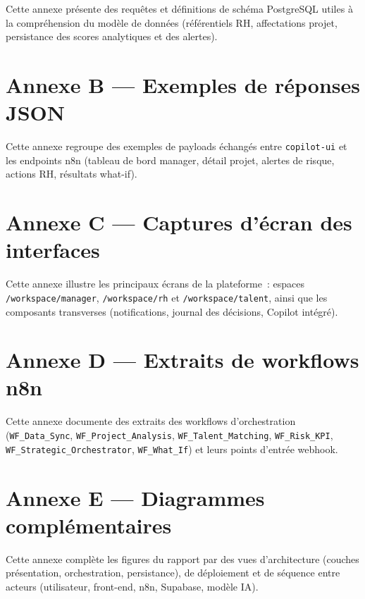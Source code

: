 Cette annexe présente des requêtes et définitions de schéma PostgreSQL utiles à la compréhension du modèle de données (référentiels RH, affectations projet, persistance des scores analytiques et des alertes).

\section*{Annexe B --- Exemples de réponses JSON}
\label{annexe:json}

Cette annexe regroupe des exemples de payloads échangés entre \texttt{copilot-ui} et les endpoints n8n (tableau de bord manager, détail projet, alertes de risque, actions RH, résultats what-if).

\section*{Annexe C --- Captures d'écran des interfaces}
\label{annexe:captures}

Cette annexe illustre les principaux écrans de la plateforme~: espaces \texttt{/workspace/manager}, \texttt{/workspace/rh} et \texttt{/workspace/talent}, ainsi que les composants transverses (notifications, journal des décisions, Copilot intégré).

\section*{Annexe D --- Extraits de workflows n8n}
\label{annexe:n8n}

Cette annexe documente des extraits des workflows d'orchestration (\texttt{WF\_Data\_Sync}, \texttt{WF\_Project\_Analysis}, \texttt{WF\_Talent\_Matching}, \texttt{WF\_Risk\_KPI}, \texttt{WF\_Strategic\_Orchestrator}, \texttt{WF\_What\_If}) et leurs points d'entrée webhook.

\section*{Annexe E --- Diagrammes complémentaires}
\label{annexe:diagrammes}

Cette annexe complète les figures du rapport par des vues d'architecture (couches présentation, orchestration, persistance), de déploiement et de séquence entre acteurs (utilisateur, front-end, n8n, Supabase, modèle IA).
\newpage